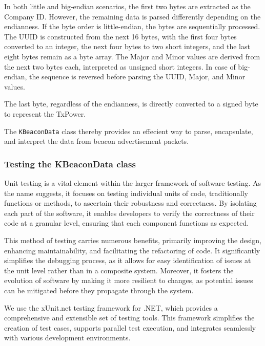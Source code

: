 In both little and big-endian scenarios, the first two bytes are extracted as the Company ID.
However, the remaining data is parsed differently depending on the endianness. If the byte order is little-endian, the bytes are sequentially processed. The UUID is constructed from the next 16 bytes, with the first four bytes converted to an integer, the next four bytes to two short integers, and the last eight bytes remain as a byte array. The Major and Minor values are derived from the next two bytes each, interpreted as unsigned short integers. In case of big-endian, the sequence is reversed before parsing the UUID, Major, and Minor values.

The last byte, regardless of the endianness, is directly converted to a signed byte to represent the TxPower.


The \texttt{KBeaconData} class thereby provides an effecient way to parse, encapsulate, and interpret the data from beacon advertisement packets.

\subsubsection{Testing the KBeaconData class}
Unit testing is a vital element within the larger framework of software testing. 
As the name suggests, it focuses on testing individual units of code, traditionally functions or methods, to ascertain their robustness and correctness. By isolating each part of the software, it enables developers to verify the correctness of their code at a granular level, ensuring that each component functions as expected.\cite{sommervilleSoftwareEngineering2016}

This method of testing carries numerous benefits, primarily improving the design, enhancing maintainability, and facilitating the refactoring of code. It significantly simplifies the debugging process, as it allows for easy identification of issues at the unit level rather than in a composite system. Moreover, it fosters the evolution of software by making it more resilient to changes, as potential issues can be mitigated before they propagate through the system.\cite{sommervilleSoftwareEngineering2016}

We use the xUnit.net testing framework for .NET, which provides a comprehensive and extensible set of testing tools. This framework simplifies the creation of test cases, supports parallel test execution, and integrates seamlessly with various development environments.\cite{xunitdotnet}

